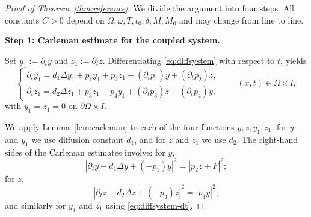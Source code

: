 \documentclass[10pt,a4paper]{amsart}
\newcommand{\Lap}{\Delta}
\newcommand{\Om}{\Omega}
\newcommand{\p}{\partial}
\begin{document}
\begin{proof}[Proof of Theorem~\ref{thm:reference}]
We divide the argument into four steps. All constants $C>0$ depend on $\Omega,\omega,T,t_0,\delta,M,M_0$ and may change from line to line.

\medskip
\noindent\textbf{Step 1: Carleman estimate for the coupled system.}

Set $y_1:=\p_t y$ and $z_1:=\p_t z$.
Differentiating \eqref{eq:diffsystem} with respect to $t$, yields
\begin{equation}\label{eq:diffsystem-dt}
\begin{cases}
\p_t y_1 = d_1\Lap y_1 + p_1 y_1 + p_2 z_1
 + (\p_t p_1) y + (\p_t p_2) z,\\[3pt]
\p_t z_1 = d_2\Lap z_1 + p_3 z_1 + p_4 y_1
 + (\p_t p_3) z + (\p_t p_4) y,
\end{cases}
\qquad (x,t)\in \Omega\times I,
\end{equation}
with $y_1=z_1=0$ on $\p\Om\times I$.

We apply Lemma~\ref{lem:carleman} to each of the four functions $y,z,y_1,z_1$:
for $y$ and $y_1$ we use diffusion constant $d_1$, and for $z$ and $z_1$ we
use $d_2$.
The right-hand sides of the Carleman estimates involve:
for $y$, $$|\p_t y-d_1\Lap y+(-p_1)y|^2=|p_2 z+F|^2;$$
for $z$, $$|\p_t z-d_2\Lap z+(-p_3)z|^2=|p_4 y|^2;$$
and similarly for $y_1$ and $z_1$ using \eqref{eq:diffsystem-dt}.


\end{proof}
\end{document}
